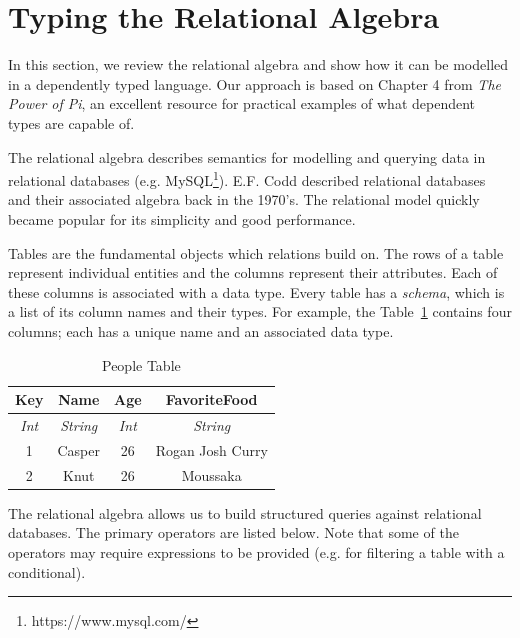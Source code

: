 \documentclass[12pt]{article}
\begin{document}
\section{Typing the Relational Algebra}\label{sec:typing_the_relational_algebra}

In this section, we review the relational algebra and show how it can be modelled in a dependently typed language.
Our approach is based on Chapter 4 from \textit{The Power of Pi}\cite{OurySwierstra08PowerOfPi}, an excellent resource for practical examples of what dependent types are capable of.

The relational algebra describes semantics for modelling and querying data in relational databases (e.g. MySQL\footnote{https://www.mysql.com/}).
E.F. Codd described relational databases and their associated algebra back in the 1970's\cite{codd70}.
The relational model quickly became popular for its simplicity and good performance.

Tables are the fundamental objects which relations build on.
The rows of a table represent individual entities and the columns represent their attributes.
Each of these columns is associated with a data type.
Every table has a \textit{schema}, which is a list of its column names and their types.
For example, the Table~\ref{tab:people_table} contains four columns; each has a unique name and an associated data type.

\begin{table}[tb]
    \caption{People Table}
    \label{tab:people_table}
    \centering

    \begin{tabular}{|c|c|c|c|}
    \hline

    \hline
    \textbf{Key} & \textbf{Name} & \textbf{Age} & \textbf{FavoriteFood} \\
    \hline
    \textit{Int} & \textit{String} & \textit{Int} & \textit{String} \\
    \hline
    \hline
       1 & Casper & 26 & Rogan Josh Curry \\
       2 & Knut & 26 & Moussaka \\
    \hline

    \end{tabular}
\end{table}

The relational algebra allows us to build structured queries against relational databases.
The primary operators are listed below.
Note that some of the operators may require expressions to be provided (e.g. for filtering a table with a conditional).
\end{document}
